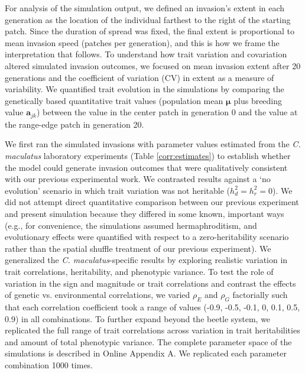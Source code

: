 \documentclass[11pt]{article}
\begin{document}
For analysis of the simulation output, we defined an invasion's extent in each generation as the location of the individual farthest to the right of the starting patch.
Since the duration of spread was fixed, the final extent is proportional to mean invasion speed (patches per generation), and this is how we frame the interpretation that follows.
To understand how trait variation and covariation altered simulated invasion outcomes, we focused on mean invasion extent after 20 generations and the coefficient of variation (CV) in extent as a measure of variability.
We quantified trait evolution in the simulations by comparing the genetically based quantitative trait values (population mean $\bm{\mu}$ plus breeding value $\bm{a}_{jk}$) between the value in the center patch in generation 0 and the value at the range-edge patch in generation 20.

We first ran the simulated invasions with parameter values estimated from the \textit{C. maculatus} laboratory experiments (Table \ref{corr:estimates}) to establish whether the model could generate invasion outcomes that were qualitatively consistent with our previous experimental work. %
We contrasted results against a `no evolution' scenario in which trait variation was not heritable ($h^{2}_d = h^{2}_r = 0$).
We did not attempt direct quantitative comparison between our previous experiment and present simulation because they differed in some known, important ways (e.g., for convenience, the simulations assumed hermaphroditism, and evolutionary effects were quantified with respect to a zero-heritability scenario rather than the spatial shuffle treatment of our previous experiment).
We generalized the \textit{C. maculatus}-specific results by exploring realistic variation in trait correlations, heritability, and phenotypic variance.
To test the role of variation in the sign and magnitude or trait correlations and contrast the effects of genetic vs. environmental correlations, we varied $\rho_{E}$ and $\rho_{G}$ factorially such that each correlation coefficient took a range of values (-0.9, -0.5, -0.1, 0, 0.1, 0.5, 0.9) in all combinations.
To further expand beyond the beetle system, we replicated the full range of trait correlations across variation in trait heritabilities and amount of total phenotypic variance. 
The complete parameter space of the simulations is described in Online Appendix A. 
We replicated each parameter combination 1000 times.
\end{document}
